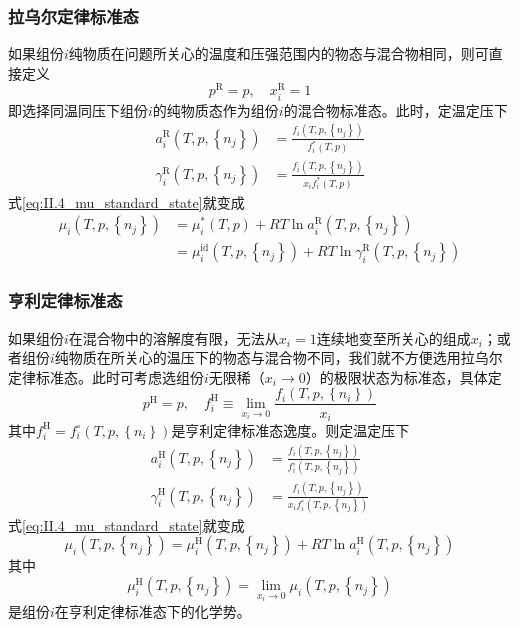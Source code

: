 \documentclass[main.tex]{subfiles}
\begin{document}
\subsubsection{拉乌尔定律标准态}
如果组份$i$纯物质在问题所关心的温度和压强范围内的物态与混合物相同，则可直接定义
\[p^\text{R}=p,\quad x^\text{R}_i=1\]
即选择同温同压下组份$i$的纯物质态作为组份$i$的混合物标准态。此时，定温定压下
\begin{align*}
    a_i^\text{R}\left(T,p,\left\{n_j\right\}\right)      & =\frac{f_i\left(T,p,\left\{n_j\right\}\right)}{f_i^*\left(T,p\right)}    \\
    \gamma_i^\text{R}\left(T,p,\left\{n_j\right\}\right) & =\frac{f_i\left(T,p,\left\{n_j\right\}\right)}{x_if_i^*\left(T,p\right)}
\end{align*}
式\eqref{eq:II.4_mu_standard_state}就变成
\begin{align}
    \mu_i\left(T,p,\left\{n_j\right\}\right) & =\mu_i^*\left(T,p\right)+RT\ln a_i^\text{R}\left(T,p,\left\{n_j\right\}\right)\label{eq:II.4_Raoult_standard_state_activity}                                       \\
                                             & =\mu_i^\text{id}\left(T,p,\left\{n_j\right\}\right)+RT\ln\gamma_i^\text{R}\left(T,p,\left\{n_j\right\}\right)\label{eq:II.4_Raoult_standard_state_activity_factor}
\end{align}

\subsubsection{亨利定律标准态}
如果组份$i$在混合物中的溶解度有限，无法从$x_i=1$连续地变至所关心的组成$x_i$；或者组份$i$纯物质在所关心的温压下的物态与混合物不同，我们就不方便选用拉乌尔定律标准态。此时可考虑选组份$i$无限稀（$x_i\rightarrow 0$）的极限状态为标准态，具体定
\[p^\text{H}=p,\quad f_i^\text{H}\equiv\lim_{x_i\to 0}\frac{f_i\left(T,p,\left\{n_i\right\}\right)}{x_i}\]
其中$f_i^\text{H}=f_i^\circ\left(T,p,\left\{n_i\right\}\right)$是亨利定律标准态逸度。则定温定压下
\begin{align*}
    a_i^\text{H}\left(T,p,\left\{n_j\right\}\right)      & =\frac{f_i\left(T,p,\left\{n_j\right\}\right)}{f_i^\circ\left(T,p,\left\{n_j\right\}\right)}    \\
    \gamma_i^\text{H}\left(T,p,\left\{n_j\right\}\right) & =\frac{f_i\left(T,p,\left\{n_j\right\}\right)}{x_if_i^\circ\left(T,p,\left\{n_j\right\}\right)}
\end{align*}
式\eqref{eq:II.4_mu_standard_state}就变成
\begin{equation}\label{eq:II.4_Henry_standard_state_activity}
    \mu_i\left(T,p,\left\{n_j\right\}\right) =\mu_i^\text{H}\left(T,p,\left\{n_j\right\}\right)+RT\ln a_i^\text{H}\left(T,p,\left\{n_j\right\}\right)
\end{equation}
其中
\[\mu_i^\text{H}\left(T,p,\left\{n_j\right\}\right)=\lim_{x_i\to 0}\mu_i\left(T,p,\left\{n_j\right\}\right)\]
是组份$i$在亨利定律标准态下的化学势。
\end{document}
